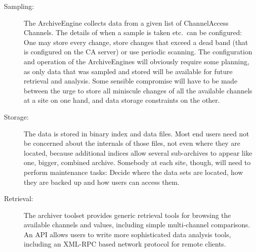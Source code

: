 \begin{description}
\item[\sffamily Sampling:]
The ArchiveEngine collects data from a given list of ChannelAccess
Channels.  The details of when a sample is taken etc.\ can be
configured: One may store every change, store changes that exceed a
dead band (that is configured on the CA server) or use periodic
scanning.
The configuration and operation of the ArchiveEngines will obviously
require some planning, as only data that was sampled and stored will
be available for future retrieval and analysis. Some sensible
compromise will have to be made between the urge to store all
miniscule changes of all the available channels at a site on one hand,
and data storage constraints on the other.

\item[\sffamily Storage:]
The data is stored in binary index and data files. Most end users need not
be concerned about the internals of those files, not even where they
are located, because additional indices allow several sub-archives to
appear like one, bigger, combined archive.
Somebody at each site, though, will need to perform maintenance
tasks: Decide where the data sets are located, how they are
backed up and how users can access them. 

\item[\sffamily Retrieval:]
The archiver toolset provides generic retrieval tools for browsing the
available channels and values, including simple multi-channel
comparisons.
An API allows users to write more sophisticated data analysis tools,
including an XML-RPC based network protocol for remote clients.
\end{description}

